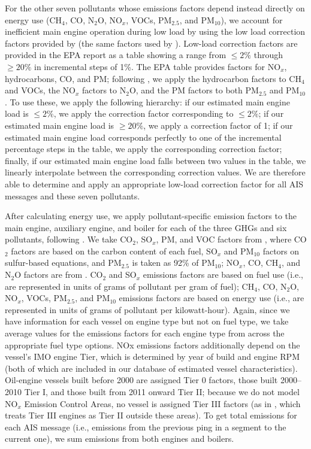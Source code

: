 \documentclass[lineno,pdflatex,sn-nature]{sn-jnl}
\begin{document}
For the other seven pollutants whose emissions factors depend instead directly on energy use (CH$_{4}$, CO, N$_{2}$O, NO$_{x}$, VOCs, PM$_{2.5}$, and PM$_{10}$), we account for inefficient main engine operation during low load by using the low load correction factors provided by \cite{epa2020ports} (the same factors used by \cite{fourth2020greenhouse}). Low-load correction factors are provided in the EPA report as a table showing a range from $\le 2\%$ through $\ge 20\%$ in incremental steps of 1\%. The EPA table provides factors for NO$_{x}$, hydrocarbons, CO, and PM; following \cite{epa2020ports}, we apply the hydrocarbon factors to CH$_{4}$ and VOCs, the NO$_{x}$ factors to N$_{2}$O, and the PM factors to both PM$_{2.5}$ and PM$_{10}$. To use these, we apply the following hierarchy: if our estimated main engine load is $\le 2\%$, we apply the correction factor corresponding to $\le 2\%$; if our estimated main engine load is $\ge 20\%$, we apply a correction factor of 1; if our estimated main engine load corresponds perfectly to one of the incremental percentage steps in the table, we apply the corresponding  correction factor; finally, if our estimated main engine load falls between two values in the table, we linearly interpolate between the corresponding correction values. We are therefore able to determine and apply an appropriate low-load correction factor for all AIS messages and these seven pollutants.

After calculating energy use, we apply pollutant-specific emission factors to the main engine, auxiliary engine, and boiler for each of the three GHGs and six pollutants, following \cite{olmer2017greenhouse, fourth2020greenhouse}. We take CO$_{2}$, SO$_{x}$, PM, and VOC factors from \cite{fourth2020greenhouse}, where CO$_{2}$ factors are based on the carbon content of each fuel, SO$_{x}$ and PM$_{10}$ factors on sulfur-based equations, and PM$_{2.5}$ is taken as 92\% of PM$_{10}$; NO$_{x}$, CO, CH$_{4}$, and N$_{2}$O factors are from \cite{olmer2017greenhouse}. CO$_{2}$ and SO$_{x}$ emissions factors are based on fuel use (i.e., are represented in units of grams of pollutant per gram of fuel); CH$_{4}$, CO, N$_{2}$O, NO$_{x}$, VOCs, PM$_{2.5}$, and PM$_{10}$ emissions factors are based on energy use (i.e., are represented in units of grams of pollutant per kilowatt-hour). Again, since we have information for each vessel on engine type but not on fuel type, we take average values for the emissions factors for each engine type from across the appropriate fuel type options. NOx emissions factors additionally depend on the vessel’s IMO engine Tier, which is determined by year of build and engine RPM (both of which are included in our database of estimated vessel characteristics). Oil-engine vessels built before 2000 are assigned Tier 0 factors, those built 2000--2010 Tier I, and those built from 2011 onward Tier II; because we do not model NO$_{x}$ Emission Control Areas, no vessel is assigned Tier III factors (as in \cite{fourth2020greenhouse}, which treats Tier III engines as Tier II outside these areas). To get total emissions for each AIS message (i.e., emissions from the previous ping in a segment to the current one), we sum emissions from both engines and boilers.
\end{document}
